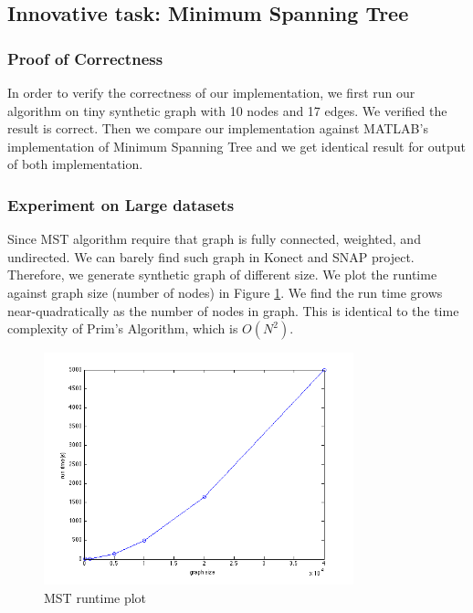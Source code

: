 \subsection{Innovative task: Minimum Spanning Tree}
\subsubsection{Proof of Correctness}
In order to verify the correctness of our implementation, we first run our algorithm on tiny synthetic graph with 10 nodes and 17 edges. We verified the result is correct. Then we compare our implementation against MATLAB's implementation of Minimum Spanning Tree and we get identical result for output of both implementation.

\subsubsection{Experiment on Large datasets}
Since MST algorithm require that graph is fully connected, weighted, and undirected. We can barely find such graph in Konect and SNAP project. Therefore, we generate synthetic graph of different size. We plot the runtime against graph size (number of nodes) in Figure \ref{mst:fig}. We find the run time grows near-quadratically as the number of nodes in graph. This is identical to the time complexity of Prim's Algorithm, which is $O(N^2)$.

\begin{figure}[!htbf]
\begin{center}
     \includegraphics[width=0.8\textwidth]{FIG/mst.png} 
\caption{MST runtime plot}
\label{mst:fig}
\end{center}
\end{figure}
